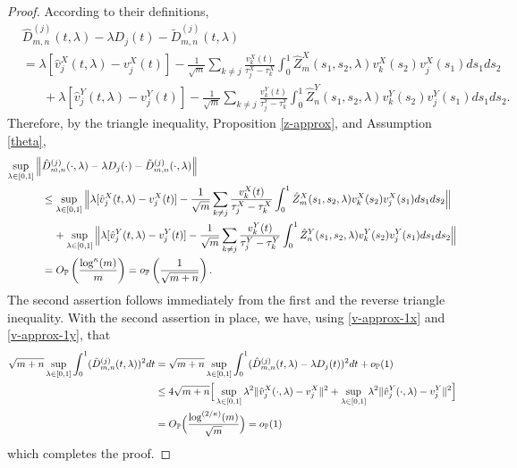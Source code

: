 \documentclass[11pt]{article}
\numberwithin{equation}{section}
\numberwithin{theorem}{section}
\numberwithin{lemma}{section}
\numberwithin{proposition}{section}
\numberwithin{cor}{section}
\numberwithin{definition}{section}
\numberwithin{cons}{section}
\numberwithin{rem}{section}
\numberwithin{exa}{section}
\numberwithin{table}{section}
\numberwithin{figure}{section}
\numberwithin{algo}{section}
\begin{document}
{{\begin{proof}%
According to their definitions,
\begin{align*}
&\hat D_{m,n}^{(j)}(t,\lambda) - \lambda D_j(t) -  \tilde D_{m,n}^{(j)}(t, \lambda)  \\
&=  \lambda [\hat v^X_j(t,\lambda) - v^X_j(t)] - \frac {1}{\sqrt{m}} \sum_{k \neq j}  \frac {v^X_k(t)}{\tau^X_j - \tau^X_k} \int^1_0 \hat Z^X_m (s_1, s_2, \lambda) v^X_k (s_2)  v^X_j(s_1) ds_1  ds_2 \\
&\;\;\;\;\;\;+ \lambda [\hat v^Y_j(t,\lambda) - v^Y_j(t)] - \frac {1}{\sqrt{m}} \sum_{k \neq j}  \frac {v^Y_k(t)}{\tau^Y_j - \tau^Y_k} \int^1_0 \hat Z^Y_n (s_1, s_2, \lambda) v^Y_k (s_2)  v^Y_j(s_1) ds_1  ds_2.
\end{align*}
Therefore, by the triangle inequality, Proposition \ref{z-approx}, and Assumption \ref{theta},
\begin{align*}
  \sup_{\lambda \in [0,1]} \Big\|  & \hat D_{m,n}^{(j)}(\cdot,\lambda) - \lambda D_j(\cdot) - \tilde D_{m,n}^{(j)}(\cdot, \lambda)   \Big\|  \\
   &\le \sup_{\lambda \in [0,1]} \Big\| \lambda [\hat v^X_j(t,\lambda) - v^X_j(t)] - \frac {1}{\sqrt{m}} \sum_{k \neq j}  \frac {v^X_k(t)}{\tau^X_j - \tau^X_k} \int^1_0 \hat Z^X_m (s_1, s_2, \lambda) v^X_k (s_2) v^X_j(s_1) ds_1  ds_2 \Big\| \\ \notag
&\;\;\;\;+ \sup_{\lambda \in [0,1]} \Big\| \lambda [\hat v^Y_j(t,\lambda) - v^Y_j(t)] - \frac {1}{\sqrt{m}} \sum_{k \neq j}  \frac {v^Y_k(t)}{\tau^Y_j - \tau^Y_k} \int^1_0 \hat Z^Y_n (s_1, s_2, \lambda) v^Y_k (s_2) v^Y_j(s_1) ds_1  ds_2 \Big\| \\
&=O_\mathbb{P}\left( \frac{\log^\kappa(m  )}{m}\right) = o_\mathbb{P}\left(\frac{1}{\sqrt{m+n}}\right).
\end{align*}
The second assertion follows immediately from the first and the reverse triangle inequality. With the second assertion in place, we have, using \eqref{v-approx-1x} and \eqref{v-approx-1y}, that
\begin{align}
\sqrt{m+n} \sup_{\lambda \in [0,1]}  \int^1_0 (\tilde D^{(j)}_{m,n} (t, \lambda))^2 dt &= \sqrt{m+n}  \sup_{\lambda \in [0,1]} \int^1_0 (\hat{D}_{m,n}^{(j)}(t,\lambda) - \lambda D_j(t))^2dt+ o_{\mathbb{P}}(1) \notag \\
&\le 4 \sqrt{m+n} \Big[ \sup_{\lambda \in [0,1]} \lambda^2 \| \hat{v}^X_j(\cdot,\lambda) - v^X_j\|^2 + \sup_{\lambda \in [0,1]} \lambda^2 \| \hat{v}^Y_j(\cdot,\lambda) - v^Y_j\|^2 \Big] \notag \\
& = O_\mathbb{P}\Big(\frac{\log^{(2/\kappa)}(m)}{\sqrt{m}} \Big) = o_\mathbb{P}(1)  \notag
\end{align}
which completes the proof.
\end{proof}

}}
\end{document}
